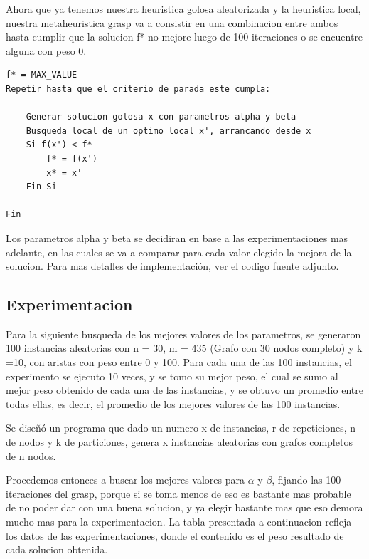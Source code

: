 \documentclass[10pt,a4paper]{article}
\begin{document}
\bigskip
Ahora que ya tenemos nuestra heuristica golosa aleatorizada y la heuristica local, nuestra metaheuristica grasp va a consistir en una combinacion entre ambos hasta cumplir que la solucion f* no mejore luego de 100 iteraciones o se encuentre alguna con peso 0.

\bigskip
\begin{lstlisting}
f* = MAX_VALUE
Repetir hasta que el criterio de parada este cumpla:

	Generar solucion golosa x con parametros alpha y beta
	Busqueda local de un optimo local x', arrancando desde x
	Si f(x') < f*
		f* = f(x')
		x* = x'
	Fin Si
	
Fin
\end{lstlisting}

Los parametros alpha y beta se decidiran en base a las experimentaciones mas adelante, en las cuales se va a comparar para cada valor elegido la mejora de la solucion. Para mas detalles de implementación, ver el codigo fuente adjunto.
\newpage

\subsection{Experimentacion}
Para la siguiente busqueda de los mejores valores de los parametros, se generaron 100 instancias aleatorias con n = 30, m = 435 (Grafo con 30 nodos completo) y k =10, con aristas con peso entre 0 y 100.
Para cada una de las 100 instancias, el experimento se ejecuto 10 veces, y se tomo su  mejor peso, el cual se sumo al mejor peso obtenido de cada una de las instancias, y se obtuvo un promedio entre todas ellas, es decir, el promedio de los mejores valores de las 100 instancias.

Se diseñó un programa que dado un numero x de instancias, r de repeticiones, n de nodos y k de particiones, genera x instancias aleatorias con grafos completos de n nodos.

Procedemos entonces a buscar los mejores valores para $\alpha$ y $\beta$, fijando las 100 iteraciones del grasp, porque si se toma menos de eso es bastante mas probable de no poder dar con una buena solucion, y ya elegir bastante mas que eso demora mucho mas para la experimentacion. La tabla presentada a continuacion refleja los datos de las experimentaciones, donde el contenido es el peso resultado de cada solucion obtenida.
\end{document}
